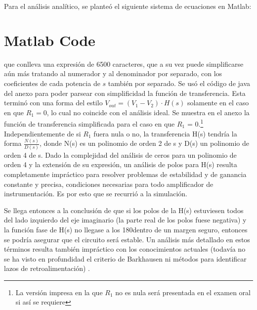 \documentclass[../../tc_tp3_main.tex]{subfiles}
\begin{document}
 Para el análisis analítico, se planteó el siguiente sistema de ecuaciones en Matlab: 
 


\section*{Matlab Code}



que conlleva una expresión de 6500 caracteres, que a su vez puede simplificarse aún más tratando al numerador y al denominador por separado, con los coeficientes de cada potencia de $s$ también por separado. Se usó el código de java del anexo para poder parsear con simplificidad la función de transferencia. Esta terminó con una forma del estilo $V_{out} = (V_1 - V_2)\cdot H(s)$ solamente en el caso en que $R_1 = 0$, lo cual no coincide con el análisis ideal. Se muestra en el anexo la función de transferencia simplificada para el caso en que $R_1$ = 0.\footnote{La versión impresa en la que $R_1$ no es nula será presentada en el examen oral si así se requiere} Independientemente de si $R_1$ fuera nula o no, la transferencia H(s) tendría la forma $\frac{N(s)}{D(s)}$, donde N(s) es un polinomio de orden 2 de s y D(s) un polinomio de orden 4 de s. Dado la complejidad del análisis de ceros para un polinomio de orden 4 y la extensión de su expresión, un análisis de polos para H(s) resulta completamente impráctico para resolver problemas de estabilidad y de ganancia constante y precisa, condiciones necesarias para todo amplificador de instrumentación. Es por esto que se recurrió a la simulación. \par
Se llega entonces a la conclusión de que si los polos de la H(s) estuviesen todos del lado izquierdo del eje imaginario (la parte real de los polos fuese negativa) y la función fase de H(s) no llegase a los 180\textdegree dentro de un margen seguro, entonces se podría asegurar que el circuito será estable. Un análisis más detallado en estos términos resulta también impráctico con los conocimientos actuales (todavía no se ha visto en profundidad el criterio de Barkhausen ni métodos para identificar lazos de retroalimentación) .\par
\end{document}
